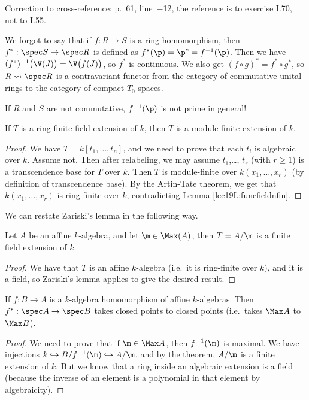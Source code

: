  Correction to cross-reference: p.~61, line~$-$12, the reference is to exercise I.70, not
 to I.55.

 We forgot to say that if $f:R\to S$ is a ring homomorphism, then $f^*:\spec S\to \spec
 R$ is defined as $f^*(\p)=\p^c=f^{-1}(\p)$. Then we have $(f^*)^{-1}\bigl(
 \V(J)\bigr)=\V\bigl(f(J)\bigr)$, so $f^*$ is continuous. We also get $(f\circ
 g)^*=f^*\circ g^*$, so $R\rightsquigarrow \spec R$ is a contravariant functor from
 the category of commutative unital rings to the category of compact $T_0$ spaces.

 \begin{remark}
   If $R$ and $S$ are not commutative, $f^{-1}(\p)$ is not prime in general!
 \end{remark}

 \begin{lemma}[Zariski]
   If $T$ is a ring-finite field extension of $k$, then $T$ is a module-finite extension
   of $k$.
 \end{lemma}
 \begin{proof}
   We have $T=k[t_1,\dots, t_n]$, and we need to prove that each $t_i$ is algebraic over
   $k$. Assume not. Then after relabeling, we may assume $t_1$,\dots, $t_r$ (with $r\ge
   1$) is a transcendence base for $T$ over $k$. Then $T$ is module-finite over
   $k(x_1,\dots, x_r)$ (by definition of transcendence base). By the Artin-Tate theorem,
   we get that $k(x_1,\dots, x_r)$ is ring-finite over $k$, contradicting Lemma
   \ref{lec19L:funcfieldnfin}.
 \end{proof}
 We can restate Zariski's lemma in the following way.
 \begin{theorem}
   Let $A$ be an affine $k$-algebra, and let $\m\in \Max(A)$, then $T=A/\m$ is a finite
   field extension of $k$.
 \end{theorem}
 \begin{proof}
   We have that $T$ is an affine $k$-algebra (i.e.\ it is ring-finite over $k$), and it
   is a field, so Zariski's lemma applies to give the desired result.
 \end{proof}
 \begin{corollary} \label{lec20C:1}
   If $f:B\to A$ is a $k$-algebra homomorphism of affine $k$-algebras. Then $f^*:\spec
   A\to \spec B$ takes closed points to closed points (i.e.\ takes $\Max A$ to $\Max B$).
 \end{corollary}
 \begin{proof}
   We need to prove that if $\m\in \Max A$, then $f^{-1}(\m)$ is maximal. We have
   injections $k\hookrightarrow B/f^{-1}(\m)\hookrightarrow A/\m$, and by the theorem,
   $A/\m$ is a finite extension of $k$. But we know that a ring inside an algebraic
   extension is a field (because the inverse of an element is a polynomial in that
   element by algebraicity).
 \end{proof}
